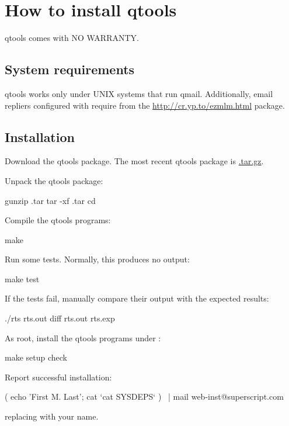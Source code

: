 
\chapter{How to install qtools}

qtools comes with NO WARRANTY.

\section{System requirements}
qtools works only under UNIX systems that run qmail.  Additionally,
email repliers configured with  require
 from the \href{ezmlm}{http://cr.yp.to/ezmlm.html}
package.

\section{Installation}

Download the qtools package.  The most recent qtools package is
\href{\version{qtools}}{.tar.gz}.

Unpack the qtools package:
\begin{code}
  gunzip .tar
  tar -xf .tar
  cd 
\end{code}

Compile the qtools programs:
\begin{code}
  make
\end{code}

Run some tests.  Normally, this produces no output:
\begin{code}
  make test
\end{code}
If the tests fail, manually compare their output with the expected results:
\begin{code}
  ./rts \>rts.out
  diff rts.out rts.exp
\end{code}

As root, install the qtools programs under :
\begin{code}
  make setup check
\end{code}

Report successful installation:
\begin{code}
  ( echo 'First M. Last'; cat `cat SYSDEPS` ) \
  | mail web-inst@superscript.com
\end{code}
replacing  with your name.

